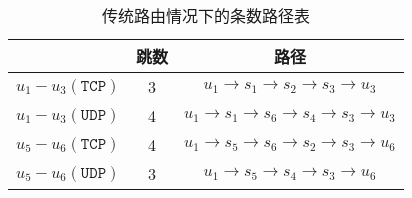 
\begin{table}[h]
  \centering
  \begin{tabular}{ccc}
    \toprule
    & 跳数 & 路径 \\
    \midrule
    $ u_1 - u_3(\texttt{TCP}) $ & 3 & $ u_1 \rightarrow s_1 \rightarrow s_2 \rightarrow s_3 \rightarrow u_3 $ \\
    $ u_1 - u_3(\texttt{UDP}) $ & 4 & $ u_1 \rightarrow s_1 \rightarrow s_6 \rightarrow s_4 \rightarrow s_3 \rightarrow u_3 $ \\
    $ u_5 - u_6(\texttt{TCP}) $ & 4 & $ u_1 \rightarrow s_5 \rightarrow s_6 \rightarrow s_2 \rightarrow s_3 \rightarrow u_6 $ \\
    $ u_5 - u_6(\texttt{UDP}) $ & 3 & $ u_1 \rightarrow s_5 \rightarrow s_4 \rightarrow s_3 \rightarrow u_6 $ \\
    \bottomrule
  \end{tabular}
  \caption{传统路由情况下的条数路径表}
\end{table}